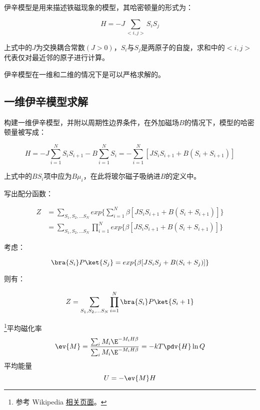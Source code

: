
\begin{issues}
\issueDraft
\issueMissDepend
\end{issues}

伊辛模型是用来描述铁磁现象的模型，其哈密顿量的形式为：

\begin{equation}
H=-J\sum\limits_{<i,j>}S_iS_j
\end{equation}

上式中的$J$为交换耦合常数$(J>0)$，$S_i$与$S_j$是两原子的自旋，求和中的$<i,j>$代表仅对最近邻的原子进行计算。

伊辛模型在一维和二维的情况下是可以严格求解的。

\subsection{一维伊辛模型求解}

构建一维伊辛模型，并附以周期性边界条件，在外加磁场$B$的情况下，模型的哈密顿量被写成：

\begin{equation}
H=-J\sum\limits_{i=1}^NS_iS_{i+1}-B\sum\limits_{i=1}^NS_i=-\sum\limits_{i=1}^N[JS_iS_{i+1}+B(S_i+S_{i+1})]
\end{equation}

上式中的$BS_i$项中应为$B\mu_i$，在此将玻尔磁子吸纳进$B$的定义中。

写出配分函数：

\begin{align}
Z&=\sum\limits_{S_1,S_2,...S_N}exp\{\sum\limits_{i=1}^N\beta[JS_iS_{i+1}+B(S_i+S_{i+1})]\} \\
&=\sum\limits_{S_1,S_2,...S_N}\prod\limits_{i=1}^N exp\{\beta[JS_iS_{i+1}+B(S_i+S_{i+1})]\}
\end{align}

考虑：

\begin{equation}
\bra{S_i}P\ket{S_j}=exp\{\beta[JS_iS_{j}+B(S_i+S_{j})]\}
\end{equation}

则有：

\begin{align}
Z=\sum\limits_{S_1,S_2,...S_N}\prod\limits_{i=1}^N\bra{S_i}P\ket{S_i+1}
\end{align}










\footnote{参考 Wikipedia \href{https://en.wikipedia.org/wiki/Ising_model}{相关页面}。}平均磁化率
\begin{equation}
\ev{M} = \frac{\sum_i M_i \E^{-M_i H \beta}}{\sum_i M_i \E^{-M_i H\beta}} = -kT \pdv{H} \ln Q
\end{equation}
平均能量
\begin{equation}
U = - \ev{M} H
\end{equation}
